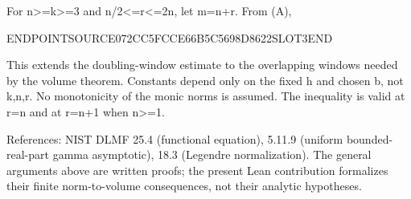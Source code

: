 For n\textgreater=k\textgreater=3 and n/2\textless=r\textless=2n, let m=n+r. From (A),

ENDPOINTSOURCE072CC5FCCE66B5C5698D8622SLOT3END

This extends the doubling-window estimate to the overlapping windows needed by the volume theorem. Constants depend only on the fixed h and chosen b, not k,n,r. No monotonicity of the monic norms is assumed. The inequality is valid at r=n and at r=n+1 when n\textgreater=1.

References: NIST DLMF 25.4 (functional equation), 5.11.9 (uniform bounded-real-part gamma asymptotic), 18.3 (Legendre normalization). The general arguments above are written proofs; the present Lean contribution formalizes their finite norm-to-volume consequences, not their analytic hypotheses.
